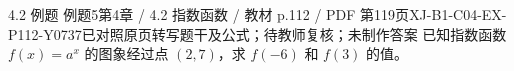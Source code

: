 \par\noindent\begin{minipage}{\linewidth}
\begin{bankitem}{4.2 例题 例题5}{第4章 / 4.2 指数函数 / 教材 p.112 / PDF 第119页}{XJ-B1-C04-EX-P112-Y0737}{已对照原页转写题干及公式；待教师复核；未制作答案}
已知指数函数 $f(x)=a^x$ 的图象经过点 $(2,7)$，求 $f(-6)$ 和 $f(3)$ 的值。
\end{bankitem}
\end{minipage}\par\medskip
